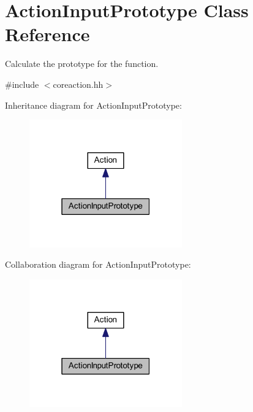 \hypertarget{class_action_input_prototype}{}\section{Action\+Input\+Prototype Class Reference}
\label{class_action_input_prototype}


Calculate the prototype for the function.  




{\ttfamily \#include $<$coreaction.\+hh$>$}



Inheritance diagram for Action\+Input\+Prototype\+:
\nopagebreak
\begin{figure}[H]
\begin{center}
\leavevmode
\includegraphics[width=187pt]{class_action_input_prototype__inherit__graph}
\end{center}
\end{figure}


Collaboration diagram for Action\+Input\+Prototype\+:
\nopagebreak
\begin{figure}[H]
\begin{center}
\leavevmode
\includegraphics[width=187pt]{class_action_input_prototype__coll__graph}
\end{center}
\end{figure}

